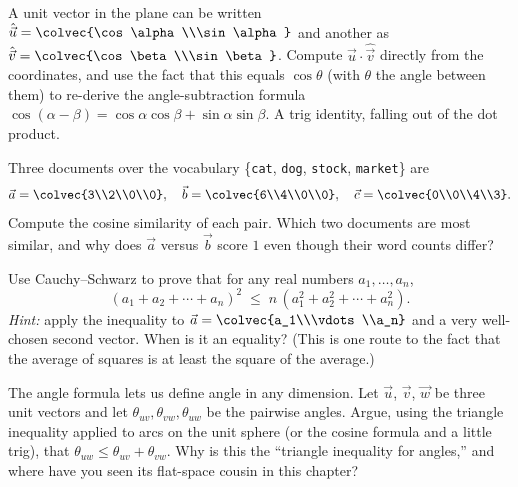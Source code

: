 \begin{exercise}
A unit vector in the plane can be written
$\hat{\vec u}=\colvec{\cos\alpha\\\sin\alpha}$ and another as
$\hat{\vec v}=\colvec{\cos\beta\\\sin\beta}$. Compute
$\hat{\vec u}\cdot\hat{\vec v}$ directly from the coordinates, and use the fact that
this equals $\cos\theta$ (with $\theta$ the angle between them) to re-derive the
angle-subtraction formula
$\cos(\alpha-\beta)=\cos\alpha\cos\beta+\sin\alpha\sin\beta$. A trig identity,
falling out of the dot product.
\end{exercise}

\begin{exercise}
Three documents over the vocabulary \{\texttt{cat}, \texttt{dog}, \texttt{stock},
\texttt{market}\} are
\[
  \vec a=\colvec{3\\2\\0\\0},\quad
  \vec b=\colvec{6\\4\\0\\0},\quad
  \vec c=\colvec{0\\0\\4\\3}.
\]
Compute the cosine similarity of each pair. Which two documents are most similar, and
why does $\vec a$ versus $\vec b$ score $1$ even though their word counts differ?
\end{exercise}

\begin{exercise}[Challenge]
Use Cauchy--Schwarz to prove that for any real numbers $a_1,\dots,a_n$,
\[
  (a_1 + a_2 + \cdots + a_n)^2 \;\le\; n\,(a_1^2 + a_2^2 + \cdots + a_n^2).
\]
\emph{Hint:} apply the inequality to $\vec a = \colvec{a_1\\\vdots\\a_n}$ and a very
well-chosen second vector. When is it an equality? (This is one route to the fact
that the average of squares is at least the square of the average.)
\end{exercise}

\begin{exercise}[Challenge]
The angle formula lets us define angle in any dimension. Let $\vec u$, $\vec v$,
$\vec w$ be three unit vectors and let
$\theta_{uv},\theta_{vw},\theta_{uw}$ be the pairwise angles. Argue, using the
triangle inequality applied to arcs on the unit sphere (or the cosine formula and a
little trig), that $\theta_{uw}\le\theta_{uv}+\theta_{vw}$. Why is this the
``triangle inequality for angles,'' and where have you seen its flat-space cousin in
this chapter?
\end{exercise}
